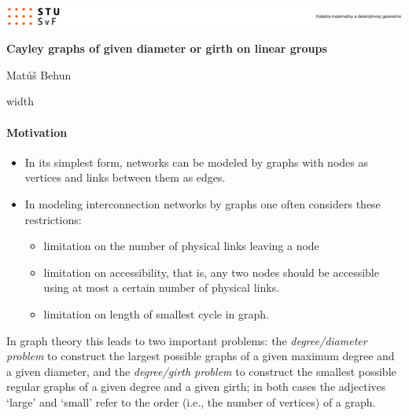 \documentclass[portrait,a0,final]{a0poster}
\begin{document}
\renewcommand{\baselinestretch}{1.5}
\fontsize{25pt}{20pt}
\selectfont

\begin{center}
\includegraphics[width=\textwidth]{header.eps}
\end{center}

\centerline{\huge \bf{Cayley graphs of given diameter or girth on linear groups}}
\vskip 1cm 
\centerline{\Large Mat\'u\v{s} Behun}
\vskip 0.5cm
\leaders\vrule width \textwidth\vskip 3pt %

\begin{multicols}{3}
\paragraph{Motivation}
\begin{itemize}
	\item In its simplest form, networks can be modeled by graphs with nodes as vertices and links between them as edges.
	\item In modeling interconnection networks by graphs one often considers these restrictions:
	\begin{itemize}
		\item limitation on the number of physical links leaving a node
		\item limitation on accessibility, that is, any two nodes should be accessible using at most a certain number of physical links.
		\item limitation on length of smallest cycle in graph.
	\end{itemize}
\end{itemize}

In graph theory this leads to two important problems: the {\em degree/diameter problem} to construct the largest possible graphs of a given maximum degree and a given diameter, and the {\em degree/girth problem} to construct the smallest possible regular graphs of a given degree and a given girth; in both cases the adjectives `large' and `small' refer to the order (i.e., the number of vertices) of a graph.

\end{multicols}
\end{document}
